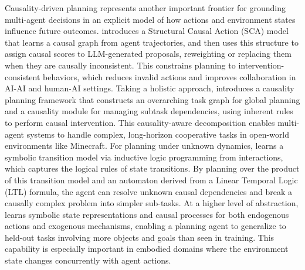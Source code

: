 \documentclass[11pt]{article}
\begin{document}
Causality-driven planning represents another important frontier for grounding multi-agent decisions in an explicit model of how actions and environment states influence future outcomes. \cite{ref189} introduces a Structural Causal Action (SCA) model that learns a causal graph from agent trajectories, and then uses this structure to assign causal scores to LLM-generated proposals, reweighting or replacing them when they are causally inconsistent. This constrains planning to intervention-consistent behaviors, which reduces invalid actions and improves collaboration in AI-AI and human-AI settings. Taking a holistic approach, \cite{ref190} introduces a causality planning framework that constructs an overarching task graph for global planning and a causality module for managing subtask dependencies, using inherent rules to perform causal intervention. This causality-aware decomposition enables multi-agent systems to handle complex, long-horizon cooperative tasks in open-world environments like Minecraft. For planning under unknown dynamics, \cite{ref191} learns a symbolic transition model via inductive logic programming from interactions, which captures the logical rules of state transitions. By planning over the product of this transition model and an automaton derived from a Linear Temporal Logic (LTL) formula, the agent can resolve unknown causal dependencies and break a causally complex problem into simpler sub-tasks. At a higher level of abstraction, \cite{ref192} learns symbolic state representations and causal processes for both endogenous actions and exogenous mechanisms, enabling a planning agent to generalize to held-out tasks involving more objects and goals than seen in training. This capability is especially important in embodied domains where the environment state changes concurrently with agent actions.
\end{document}
